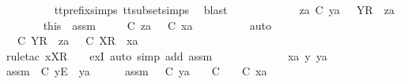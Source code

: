\begin{isabellebody}
\ \ \ \ \ \ \ \ \isamarkupfalse%
\ tt{\isacharunderscore}prefix{\isachardot}simps{\isacharparenleft}{}{\isacharparenright}\ tt{\isacharunderscore}subset{\isachardot}simps{\isacharparenleft}{}{\isacharparenright}\ \isamarkupfalse%
\ blast\isanewline
\ \ \ \ \isamarkupfalse%
\isanewline
\ \ \ \ \ \ \isamarkupfalse%
\ {\isachardoublequoteopen}za\ {\isasymle}\isactrlsub C\ ya{\isachardoublequoteclose}\ {\isachardoublequoteopen}{\isasymsigma}{\isacharprime}\ {\isacharequal}\ {\isacharbrackleft}Y{\isacharbrackright}\isactrlsub R\ {\isacharhash}\ za{\isachardoublequoteclose}\isanewline
\ \ \ \ \ \ \isamarkupfalse%
\ this\ \ assm{}\ \isamarkupfalse%
\ {\isasymrho}{\isacharprime}\ \ {\isachardoublequoteopen}{\isasymrho}{\isacharprime}\ {\isasymsubseteq}\isactrlsub C\ za\ {\isasymand}\ {\isasymrho}{\isacharprime}\ {\isasymle}\isactrlsub C\ xa{\isachardoublequoteclose}\isanewline
\ \ \ \ \ \ \ \ \isamarkupfalse%
\ auto\isanewline
\ \ \ \ \ \ \isamarkupfalse%
\ \isamarkupfalse%
\ {\isachardoublequoteopen}{\isasymexists}{\isasymrho}{\isacharprime}{\isachardot}\ {\isasymrho}{\isacharprime}\ {\isasymsubseteq}\isactrlsub C\ {\isacharbrackleft}Y{\isacharbrackright}\isactrlsub R\ {\isacharhash}\ za\ {\isasymand}\ {\isasymrho}{\isacharprime}\ {\isasymle}\isactrlsub C\ {\isacharbrackleft}X{\isacharbrackright}\isactrlsub R\ {\isacharhash}\ xa{\isachardoublequoteclose}\isanewline
\ \ \ \ \ \ \ \ \isamarkupfalse%
\ {\isacharparenleft}rule{\isacharunderscore}tac\ x{\isacharequal}{\isachardoublequoteopen}{\isacharbrackleft}X{\isacharbrackright}\isactrlsub R\ {\isacharhash}\ {\isasymrho}{\isacharprime}{\isachardoublequoteclose}\ \ exI{\isacharcomma}\ auto\ simp\ add{\isacharcolon}\ assm{}{\isacharparenright}\isanewline
\ \ \ \ \isamarkupfalse%
\isanewline
\ \ \isamarkupfalse%
\isanewline
\ \ \ \ \isamarkupfalse%
\ xa\ y\ ya\ {\isasymsigma}{\isacharprime}\isanewline
\ \ \ \ \isamarkupfalse%
\ assm{}{\isacharcolon}\ {\isachardoublequoteopen}{\isasymsigma}{\isacharprime}\ {\isasymle}\isactrlsub C\ {\isacharbrackleft}y{\isacharbrackright}\isactrlsub E\ {\isacharhash}\ ya{\isachardoublequoteclose}\isanewline
\ \ \ \ \isamarkupfalse%
\ assm{}{\isacharcolon}\ {\isachardoublequoteopen}{\isacharparenleft}{\isasymAnd}{\isasymsigma}{\isacharprime}{\isachardot}\ {\isasymsigma}{\isacharprime}\ {\isasymle}\isactrlsub C\ ya\ {\isasymLongrightarrow}\ {\isasymexists}{\isasymrho}{\isacharprime}{\isachardot}\ {\isasymrho}{\isacharprime}\ {\isasymsubseteq}\isactrlsub C\ {\isasymsigma}{\isacharprime}\ {\isasymand}\ {\isasymrho}{\isacharprime}\ {\isasymle}\isactrlsub C\ xa{\isacharparenright}{\isachardoublequoteclose}\isanewline

\end{isabellebody}
